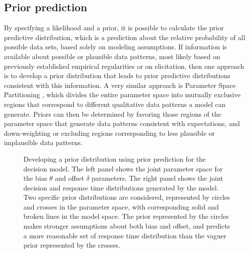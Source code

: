 \subsection{Prior prediction} 

By specifying a likelihood and a prior, it is possible to calculate the prior predictive distribution, which is a prediction about the relative probability of all possible data sets, based solely on modeling assumptions. If information is available about possible or plausible data patterns, most likely based on previously established empirical regularities or on elicitation, then one approach is to develop a prior distribution that leads to prior predictive distributions consistent with this information. A very similar approach is Parameter Space Partitioning \cite<PSP:>{PittEtAl2006}, which divides the entire parameter space into mutually exclusive regions that correspond to different qualitative data patterns a model can generate. Priors can then be determined by favoring those regions of the parameter space that generate data patterns consistent with expectations, and down-weighting or excluding regions corresponding to less plausible or implausible data patterns.

\begin{figure}[tp]
\begin{center}
\caption{Developing a prior distribution using prior prediction for the decision model. The left panel shows the joint parameter space for the bias $\theta$ and offset $\delta$ parameters. The right panel shows the joint decision and response time distributions generated by the model. Two specific prior distributions are considered, represented by circles and crosses in the parameter space, with corresponding solid and broken lines in the model space. The prior represented by the circles makes stronger assumptions about both bias and offset, and predicts a more reasonable set of response time distribution than the vaguer prior represented by the crosses.}
\label{PriorPrediction}
\end{center}
\end{figure}

